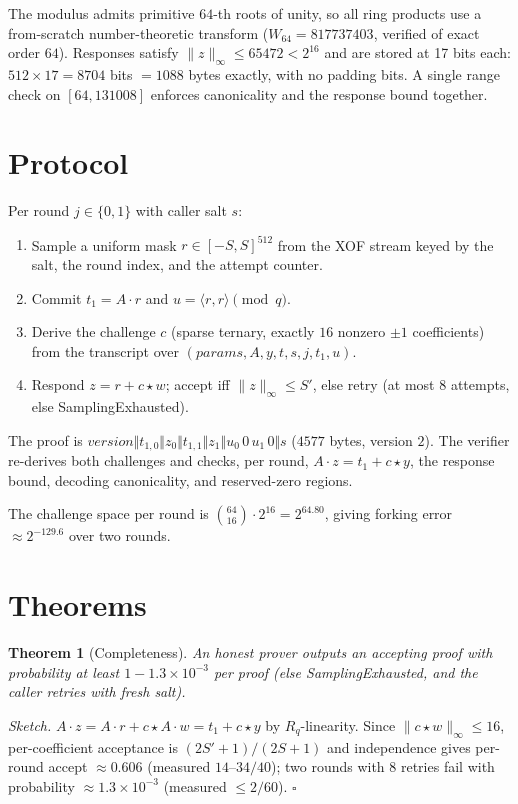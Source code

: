 \documentclass[11pt,a4paper]{article}
\newtheorem{theorem}{Theorem}[section]
\theoremstyle{remark}
\begin{document}
The modulus admits primitive $64$-th roots of unity, so all ring products
use a from-scratch number-theoretic transform ($W_{64} = 817737403$,
verified of exact order $64$). Responses satisfy
$\lVert z\rVert_\infty \le 65472 < 2^{16}$ and are stored at 17 bits each:
$512 \times 17 = 8704$ bits $= 1088$ bytes exactly, with no padding bits.
A single range check on $[64,131008]$ enforces canonicality and the
response bound together.

\section{Protocol}

Per round $j \in \{0,1\}$ with caller salt $s$:
\begin{enumerate}
\item Sample a uniform mask $r \in [-S,S]^{512}$ from the XOF stream
  keyed by the salt, the round index, and the attempt counter.
\item Commit $t_1 = A\cdot r$ and $u = \langle r,r\rangle \pmod q$.
\item Derive the challenge $c$ (sparse ternary, exactly $16$ nonzero
  $\pm 1$ coefficients) from the transcript over
  $(\mathit{params},A,y,t,s,j,t_1,u)$.
\item Respond $z = r + c\star w$; accept iff $\lVert z\rVert_\infty \le S'$,
  else retry (at most $8$ attempts, else \textsf{SamplingExhausted}).
\end{enumerate}
The proof is
$\mathit{version}\Vert t_{1,0}\Vert z_0\Vert t_{1,1}\Vert z_1\Vert
u_0\,0\,u_1\,0\Vert s$ ($4577$ bytes, version $2$). The verifier
re-derives both challenges and checks, per round,
$A\cdot z = t_1 + c\star y$, the response bound, decoding canonicality,
and reserved-zero regions.

The challenge space per round is $\binom{64}{16}\cdot 2^{16} = 2^{64.80}$,
giving forking error $\approx 2^{-129.6}$ over two rounds.

\section{Theorems}

\begin{theorem}[Completeness]
An honest prover outputs an accepting proof with probability at least
$1 - 1.3\times 10^{-3}$ per proof (else \textsf{SamplingExhausted}, and
the caller retries with fresh salt).
\end{theorem}
\noindent\textit{Sketch.} $A\cdot z = A\cdot r + c\star A\cdot w = t_1 +
c\star y$ by $R_q$-linearity. Since $\lVert c\star w\rVert_\infty \le 16$,
per-coefficient acceptance is $(2S'+1)/(2S+1)$ and independence gives
per-round accept $\approx 0.606$ (measured $14$--$34/40$); two rounds with
$8$ retries fail with probability $\approx 1.3\times 10^{-3}$ (measured
$\le 2/60$). \hfill $\square$
\end{document}
